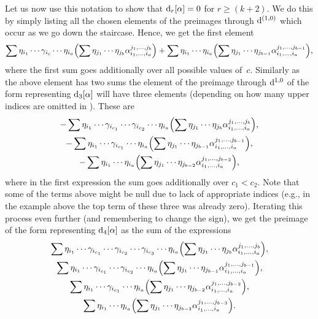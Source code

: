 \documentclass[10pt,a4paper]{amsart}
\numberwithin{equation}{section}
\theoremstyle{definition}
\begin{document}
Let us now use this notation to show that ${\rm d}_r[\alpha]=0$ for $r\geq (k+2)$. We do this by simply listing all the chosen elements of the preimages through ${\rm d}^{(1,0)}$ which occur as we go down the staircase. Hence, we get the first element
\[\sum \eta_{i_1}\cdots \gamma_{i_c}\cdots \eta_{i_a}\Bigl(\sum \eta_{j_1}\cdots \eta_{j_b}\alpha_{i_1,\dots,i_a}^{j_1,\dots,j_b}\Bigr)+\sum\eta_{i_1}\cdots \eta_{i_a}\Bigl(\sum \eta_{j_1}\cdots \eta_{j_{b-1}}\alpha_{i_1,\dots,i_a}^{j_1,\dots,j_{b-1}}\Bigr),\]
where the first sum goes additionally over all possible values of~$c$. Similarly as the above element has two sums the element of the preimage through ${\rm d}^{1,0}$ of the form representing ${\rm d}_3[\alpha]$ will have three elements (depending
on how many upper indices are omitted in ). These are
\begin{gather*}
-\sum \eta_{i_1}\cdots \gamma_{i_{c_1}}\cdots \gamma_{i_{c_2}}\cdots \eta_{i_a}\Bigl(\sum \eta_{j_1}\cdots \eta_{j_b}\alpha_{i_1,\dots,i_a}^{j_1,\dots,j_b}\Bigr),\\
-\sum \eta_{i_1}\cdots \gamma_{i_{c_1}}\cdots \eta_{i_a}\Bigl(\sum \eta_{j_1}\cdots \eta_{j_{b-1}}\alpha_{i_1,\dots,i_a}^{j_1,\dots,j_{b-1}}\Bigr),\\
-\sum \eta_{i_1}\cdots \eta_{i_a}\Bigl(\sum \eta_{j_1}\cdots \eta_{j_{b-2}}\alpha_{i_1,\dots,i_a}^{j_1,\dots,j_{b-2}}\Bigr),
\end{gather*}
where in the first expression the sum goes additionally over $c_1<c_2$. Note that some of the terms above might be null due to lack of appropriate indices (e.g., in the example above the top term of these three was already zero). Iterating this process even further (and remembering to change the sign), we get the preimage of the form representing ${\rm d}_4[\alpha]$ as the sum of the expressions
\begin{gather*}
\sum \eta_{i_1}\cdots \gamma_{i_{c_1}}\cdots \gamma_{i_{c_2}}\cdots \gamma_{i_{c_3}}\cdots \eta_{i_a}\Bigl(\sum \eta_{j_1}\cdots \eta_{j_b}\alpha_{i_1,\dots,i_a}^{j_1,\dots,j_b}\Bigr),\\
\sum \eta_{i_1}\cdots \gamma_{i_{c_1}}\cdots \gamma_{i_{c_2}}\cdots \eta_{i_a}\Bigl(\sum \eta_{j_1}\cdots \eta_{j_{b-1}}\alpha_{i_1,\dots,i_a}^{j_1,\dots,j_{b-1}}\Bigr),\\
\sum \eta_{i_1}\cdots \gamma_{i_{c_1}}\cdots \eta_{i_a}\Bigl(\sum \eta_{j_1}\cdots \eta_{j_{b-2}}\alpha_{i_1,\dots,i_a}^{j_1,\dots,j_{b-2}}\Bigr),\\
\sum \eta_{i_1}\cdots \eta_{i_a}\Bigl(\sum \eta_{j_1}\cdots \eta_{j_{b-3}}\alpha_{i_1,\dots,i_a}^{j_1,\dots,j_{b-3}}\Bigr).
\end{gather*}
\end{document}
